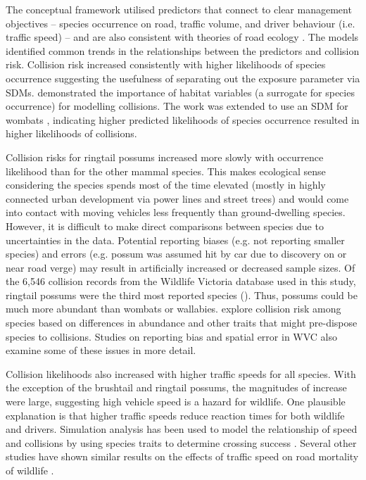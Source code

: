 The conceptual framework utilised predictors that connect to clear management objectives -- species occurrence on road, traffic volume, and driver behaviour (i.e. traffic speed) -- and are also consistent with theories of road ecology \citep[see][]{form03}. The models identified common trends in the relationships between the predictors and collision risk. Collision risk increased consistently with higher likelihoods of species occurrence suggesting the usefulness of separating out the exposure parameter via SDMs. \cite{roge09} demonstrated the importance of habitat variables (a surrogate for species occurrence) for modelling collisions. The work was extended to use an SDM for wombats \citep{roge12}, indicating higher predicted likelihoods of species occurrence resulted in higher likelihoods of collisions.

Collision risks for ringtail possums increased more slowly with occurrence likelihood than for the other mammal species.  This makes ecological sense considering the species spends most of the time elevated (mostly in highly connected urban development via power lines and street trees) and would come into contact with moving vehicles less frequently than ground-dwelling species.  However, it is difficult to make direct comparisons between species due to uncertainties in the data.  Potential reporting biases (e.g. not reporting smaller species) and errors (e.g. possum was assumed hit by car due to discovery on or near road verge) may result in artificially increased or decreased sample sizes. Of the 6,546 collision records from the Wildlife Victoria database used in this study, ringtail possums were the third most reported species ().  Thus, possums could be much more abundant than wombats or wallabies. \cite{gril14} explore collision risk among species based on differences in abundance and other traits that might pre-dispose species to collisions. Studies on reporting bias \citep[e.g.][]{snow15} and spatial error \citep[e.g.][]{guns09} in WVC also examine some of these issues in more detail.

Collision likelihoods also increased with higher traffic speeds for all species.  With the exception of the brushtail and ringtail possums, the magnitudes of increase were large, suggesting high vehicle speed is a hazard for wildlife.  One plausible explanation is that higher traffic speeds reduce reaction times for both wildlife and drivers. Simulation analysis has been used to model the relationship of speed and collisions by using species traits to determine crossing success \citep{jaar06}. Several other studies have shown similar results on the effects of traffic speed on road mortality of wildlife \citep[e.g.][]{farm12,gkri13,lao11,ramp06a,seil05,seil06,sudh09,vanl09}.

